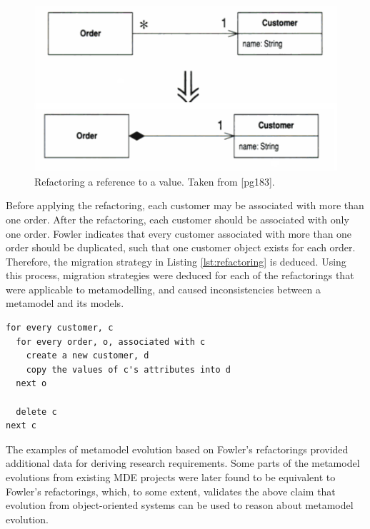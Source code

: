 \begin{figure}[htbp]
  \begin{center}
    \leavevmode
    \includegraphics[scale=0.5]{4.Analysis/exemplar_refactoring.pdf}
  \end{center}
  \caption{Refactoring a reference to a value. Taken from \cite{fowler99refactoring}[pg183].}
  \label{fig:refactoring}
\end{figure}

Before applying the refactoring, each customer may be associated with more than one order. After the refactoring, each customer should be associated with only one order. Fowler indicates that every customer associated with more than one order should be duplicated, such that one customer object exists for each order. Therefore, the migration strategy in Listing \ref{lst:refactoring} is deduced. Using this process, migration strategies were deduced for each of the refactorings that were applicable to metamodelling, and caused inconsistencies between a metamodel and its models.

\begin{lstlisting}[caption=Migration strategy for the refactoring in pseudo code., label=lst:refactoring]
for every customer, c
  for every order, o, associated with c
    create a new customer, d
    copy the values of c's attributes into d
  next o
	
  delete c
next c
\end{lstlisting}

The examples of metamodel evolution based on Fowler's refactorings provided additional data for deriving research requirements. Some parts of the metamodel evolutions from existing MDE projects were later found to be equivalent to Fowler's refactorings, which, to some extent, validates the above claim that evolution from object-oriented systems can be used to reason about metamodel evolution.

